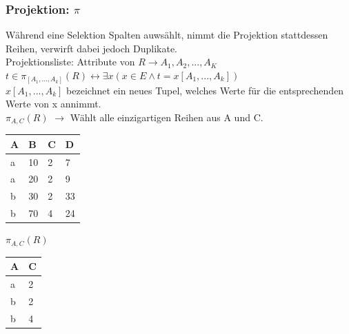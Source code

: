 \documentclass{article}
\begin{document}
 	\subsubsection{Projektion: \texorpdfstring{$\pi$}{}}
 	Während eine Selektion Spalten auwsählt, nimmt die Projektion stattdessen Reihen, verwirft dabei jedoch Duplikate. \\
 	Projektionsliste: Attribute von $R \rightarrow A_1, A_2, ..., A_K$ \\
 	$t\in \pi_{[A_1,...,A_k]}(R)\leftrightarrow \exists x(x\in E\land t=x[A_1,...,A_k])$ \\
 	$x[A_1, ..., A_k]$ bezeichnet ein neues Tupel, welches Werte für die entsprechenden Werte von x annimmt. \\
 	$\pi_{A,C}(R)$ $\to$ Wählt alle einzigartigen Reihen aus A und C. \\
 	 \begin{tabular}{| l | l | l | l |}
 		\toprule
 		A & B & C & D \\ \midrule
 		a & 10 & 2 & 7 \\ \hline
 		a & 20 & 2 & 9 \\ \hline
 		b & 30 & 2 & 33 \\ \hline
 		b & 70 & 4 & 24 \\
 		\bottomrule
 	\end{tabular} \hspace{0.5cm}
 	$\pi_{A,C}(R)$
 	\begin{tabular}{| l | l |}
 		\toprule
 		A & C  \\ \midrule
 		a & 2  \\
 		b & 2 \\
 		b & 4 \\
 		\bottomrule
 	\end{tabular}
\end{document}
